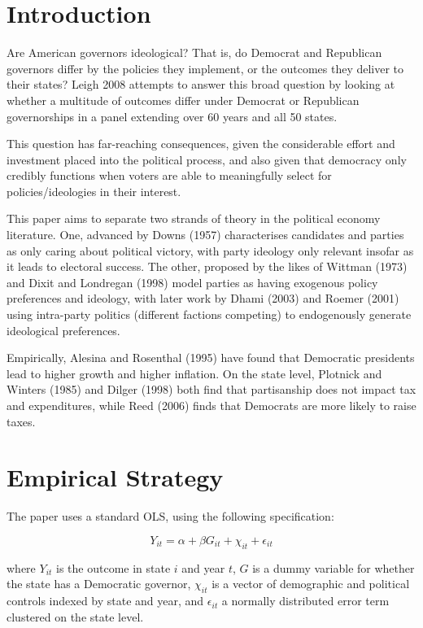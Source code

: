 \documentclass{article}
\begin{document}
\section{Introduction}

Are American governors ideological? That is, do Democrat and Republican governors differ by the policies they implement, or the outcomes they deliver to their states? Leigh 2008 attempts to answer this broad question by looking at whether a multitude of outcomes differ under Democrat or Republican governorships in a panel extending over 60 years and all 50 states. 

This question has far-reaching consequences, given the considerable effort and investment placed into the political process, and also given that democracy only credibly functions when voters are able to meaningfully select for policies/ideologies in their interest.

This paper aims to separate two strands of theory in the political economy literature. One, advanced by Downs (1957) characterises candidates and parties as only caring about political victory, with party ideology only relevant insofar as it leads to electoral success. The other, proposed by the likes of Wittman (1973) and Dixit and Londregan (1998) model parties as having exogenous policy preferences and ideology, with later work by Dhami (2003) and Roemer (2001) using intra-party politics (different factions competing) to endogenously generate ideological preferences.

Empirically, Alesina and Rosenthal (1995) have found that Democratic presidents lead to higher growth and higher inflation. On the state level, Plotnick and Winters (1985) and Dilger (1998) both find that partisanship does not impact tax and expenditures, while Reed (2006) finds that Democrats are more likely to raise taxes.


\section{Empirical Strategy}

The paper uses a standard OLS, using the following specification:

\[ Y_{it} = \alpha + \beta G_{it} + \chi_{it} + \epsilon_{it} \]

where $Y_{it}$ is the outcome in state $i$ and year $t$, $G$ is a dummy variable for whether the state has a Democratic governor, $\chi_{it}$ is a vector of demographic and political controls indexed by state and year, and $\epsilon_{it}$ a normally distributed error term clustered on the state level.
\end{document}
